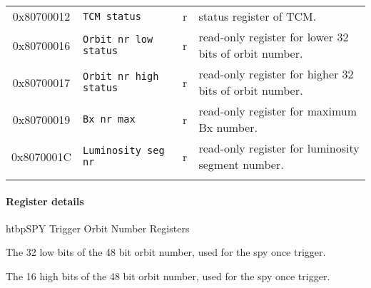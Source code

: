 \begin{longtable}{c p{} c p{}}
0x80700012 & \verb|TCM status| & r & status register of TCM.\\
0x80700016 & \verb|Orbit nr low status| & r & read-only register for lower 32 bits of orbit number.\\
0x80700017 & \verb|Orbit nr high status| & r & read-only register for higher 32 bits of orbit number.\\
0x80700019 & \verb|Bx nr max| & r & read-only register for maximum Bx number.\\
0x8070001C & \verb|Luminosity seg nr| & r & read-only register for luminosity segment number.\\
\hline
\label{tab:framework:frame_register_map}
\end{longtable}

\paragraph{Register details}
\label{sec:framework:reg_details}

\begin{register}{htbp}{SPY Trigger Orbit Number Registers}{}%
	\label{spy_trig_obrit_nr_reg}
	\begin{regdesc}
	\begin{reglist}
		\item [orbit\_nr\_low] The 32 low bits of the 48 bit orbit number, used for the spy once trigger.
		\item [orbit\_nr\_high] The 16 high bits of the 48 bit orbit number, used for the spy once trigger.
	\end{reglist}
	\end{regdesc}
\end{register}

